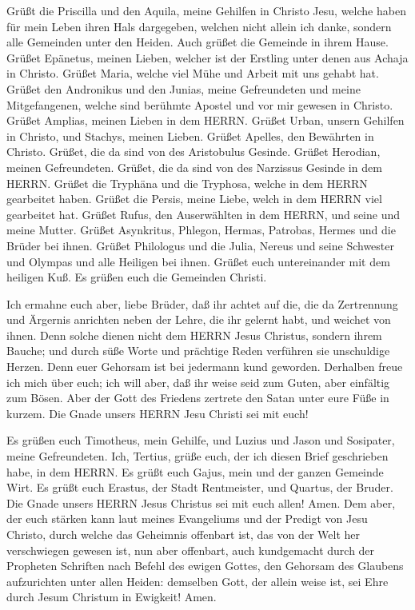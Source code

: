  Grüßt die Priscilla und den Aquila, meine Gehilfen in
Christo Jesu,  welche haben für mein Leben ihren Hals
dargegeben, welchen nicht allein ich danke, sondern alle Gemeinden unter
den Heiden.  Auch grüßet die Gemeinde in ihrem Hause. Grüßet
Epänetus, meinen Lieben, welcher ist der Erstling unter denen aus Achaja
in Christo.  Grüßet Maria, welche viel Mühe und Arbeit mit
uns gehabt hat.  Grüßet den Andronikus und den Junias, meine
Gefreundeten und meine Mitgefangenen, welche sind berühmte Apostel und
vor mir gewesen in Christo.  Grüßet Amplias, meinen Lieben
in dem HERRN.  Grüßet Urban, unsern Gehilfen in Christo, und
Stachys, meinen Lieben.  Grüßet Apelles, den Bewährten in
Christo. Grüßet, die da sind von des Aristobulus Gesinde. 
Grüßet Herodian, meinen Gefreundeten. Grüßet, die da sind von des
Narzissus Gesinde in dem HERRN.  Grüßet die Tryphäna und
die Tryphosa, welche in dem HERRN gearbeitet haben. Grüßet die Persis,
meine Liebe, welch in dem HERRN viel gearbeitet hat. 
Grüßet Rufus, den Auserwählten in dem HERRN, und seine und meine Mutter.
 Grüßet Asynkritus, Phlegon, Hermas, Patrobas, Hermes und
die Brüder bei ihnen.  Grüßet Philologus und die Julia,
Nereus und seine Schwester und Olympas und alle Heiligen bei ihnen.
 Grüßet euch untereinander mit dem heiligen Kuß. Es grüßen
euch die Gemeinden Christi.

 Ich ermahne euch aber, liebe Brüder, daß ihr achtet auf
die, die da Zertrennung und Ärgernis anrichten neben der Lehre, die ihr
gelernt habt, und weichet von ihnen.  Denn solche dienen
nicht dem HERRN Jesus Christus, sondern ihrem Bauche; und durch süße
Worte und prächtige Reden verführen sie unschuldige Herzen.
 Denn euer Gehorsam ist bei jedermann kund geworden.
Derhalben freue ich mich über euch; ich will aber, daß ihr weise seid
zum Guten, aber einfältig zum Bösen.  Aber der Gott des
Friedens zertrete den Satan unter eure Füße in kurzem. Die Gnade unsers
HERRN Jesu Christi sei mit euch!

 Es grüßen euch Timotheus, mein Gehilfe, und Luzius und
Jason und Sosipater, meine Gefreundeten.  Ich, Tertius,
grüße euch, der ich diesen Brief geschrieben habe, in dem HERRN.
 Es grüßt euch Gajus, mein und der ganzen Gemeinde Wirt. Es
grüßt euch Erastus, der Stadt Rentmeister, und Quartus, der Bruder.
 Die Gnade unsers HERRN Jesus Christus sei mit euch allen!
Amen.  Dem aber, der euch stärken kann laut meines
Evangeliums und der Predigt von Jesu Christo, durch welche das Geheimnis
offenbart ist, das von der Welt her verschwiegen gewesen ist,
 nun aber offenbart, auch kundgemacht durch der Propheten
Schriften nach Befehl des ewigen Gottes, den Gehorsam des Glaubens
aufzurichten unter allen Heiden:  demselben Gott, der
allein weise ist, sei Ehre durch Jesum Christum in Ewigkeit! Amen.

